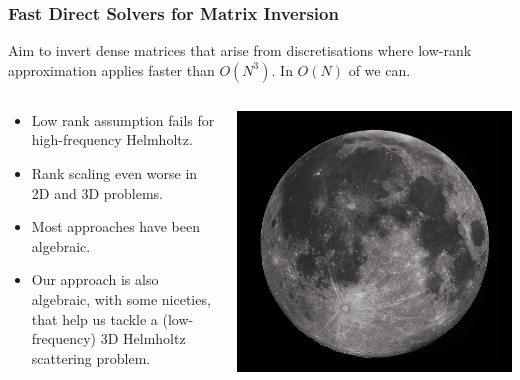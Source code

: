 \begin{frame}
    \frametitle{Fast Direct Solvers for Matrix Inversion}

    Aim to invert dense matrices that arise from discretisations where low-rank approximation applies faster than $O(N^3)$. In $O(N)$ of we can.

    \hspace{0.5pt}

    \begin{columns}
        \begin{column}{0.5\textwidth}
            \begin{itemize}
                \item Low rank assumption fails for high-frequency Helmholtz.
                \item Rank scaling even worse in 2D and 3D problems.
                \item Most approaches have been algebraic.
                \item Our approach is also algebraic, with some niceties, that help us tackle a (low-frequency) 3D Helmholtz scattering problem.
            \end{itemize}
        \end{column}
        \begin{column}{0.5\textwidth}
            \includegraphics[width=\textwidth]{assets/moon.jpg}
        \end{column}
    \end{columns}
\end{frame}


